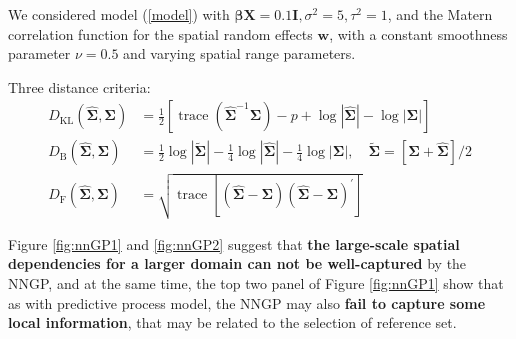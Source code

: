 \documentclass[
12pt, %
a4paper, %
oneside, %
headinclude,footinclude, %
BCOR5mm, %
]{scrartcl}
\begin{document}
We considered model (\ref{model}) with $\boldsymbol{\beta X} = 0.1\boldsymbol{I}, \sigma^2 = 5, \tau^2 = 1$, and the Matern correlation function for the spatial random effects $\boldsymbol{w}$, with a constant smoothness parameter $\nu = 0.5$ and varying spatial range parameters.

Three distance criteria:
\begin{align}
D_{\mathrm{KL}}(\hat{\mathbf{\Sigma}}, \mathbf{\Sigma}) &=\frac{1}{2}\left[\operatorname{trace}\left(\hat{\mathbf{\Sigma}}^{-1} \mathbf{\Sigma}\right)- p +\log |\hat{\mathbf{\Sigma}}|-\log |\mathbf{\Sigma}|\right] \\
D_{\mathrm{B}}(\hat{\mathbf{\Sigma}}, \mathbf{\Sigma}) &=\frac{1}{2} \log |\tilde{\mathbf{\Sigma}}|-\frac{1}{4}\log | \hat{\mathbf{\Sigma}} |-\frac{1}{4} \log | \mathbf{\Sigma} |, \quad \tilde{\mathbf{\Sigma}}=[\mathbf{\Sigma}+\hat{\mathbf{\Sigma}}] / 2 \\
D_{\mathrm{F}}(\hat{\mathbf{\Sigma}}, \mathbf{\Sigma}) &=\sqrt{\operatorname{trace}\left[(\hat{\mathbf{\Sigma}}-\mathbf{\Sigma})(\hat{\mathbf{\Sigma}}-\mathbf{\Sigma})^{\prime}\right]}
\end{align}

%

Figure \ref{fig:nnGP1} and \ref{fig:nnGP2} suggest that \textbf{the large-scale spatial dependencies for a larger domain can not be well-captured} by the NNGP, and at the same time, the top two panel of Figure \ref{fig:nnGP1} show that as with predictive process model, the NNGP may also \textbf{fail to capture some local information}, that may be related to the selection of reference set.
\end{document}
